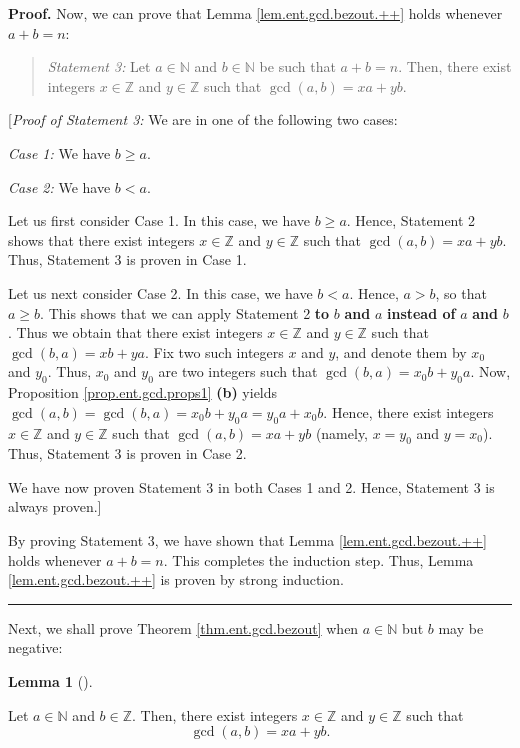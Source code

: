 \documentclass[numbers=enddot,12pt,final,onecolumn,notitlepage]{scrartcl}%
\numberwithin{exer}{subsection}
\theoremstyle{definition}
\newtheorem{lem}[theo]{Lemma}
\newenvironment{lemma}[1][]
{\begin{lem}[#1]\begin{leftbar}}
{\end{leftbar}\end{lem}}
\newenvironment{statement}{\begin{quote}}{\end{quote}}
\newenvironment{proof}[1][Proof]{\noindent\textbf{#1.} }{\ \rule{0.5em}{0.5em}}
\begin{document}
\begin{proof}
Now, we can prove that Lemma \ref{lem.ent.gcd.bezout.++} holds whenever
$a+b=n$:

\begin{statement}
\textit{Statement 3:} Let $a\in\mathbb{N}$ and $b\in\mathbb{N}$ be such that
$a+b=n$. Then, there exist integers $x\in\mathbb{Z}$ and $y\in\mathbb{Z}$ such
that $\gcd\left(  a,b\right)  =xa+yb$.
\end{statement}

[\textit{Proof of Statement 3:} We are in one of the following two cases:

\textit{Case 1:} We have $b\geq a$.

\textit{Case 2:} We have $b<a$.

Let us first consider Case 1. In this case, we have $b\geq a$. Hence,
Statement 2 shows that there exist integers $x\in\mathbb{Z}$ and
$y\in\mathbb{Z}$ such that $\gcd\left(  a,b\right)  =xa+yb$. Thus, Statement 3
is proven in Case 1.

Let us next consider Case 2. In this case, we have $b<a$. Hence, $a>b$, so
that $a\geq b$. This shows that we can apply Statement 2 \textbf{to }%
$b$\textbf{ and }$a$ \textbf{instead of }$a$ \textbf{and }$b$. Thus we obtain
that there exist integers $x\in\mathbb{Z}$ and $y\in\mathbb{Z}$ such that
$\gcd\left(  b,a\right)  =xb+ya$. Fix two such integers $x$ and $y$, and
denote them by $x_{0}$ and $y_{0}$. Thus, $x_{0}$ and $y_{0}$ are two integers
such that $\gcd\left(  b,a\right)  =x_{0}b+y_{0}a$. Now, Proposition
\ref{prop.ent.gcd.props1} \textbf{(b)} yields $\gcd\left(  a,b\right)
=\gcd\left(  b,a\right)  =x_{0}b+y_{0}a=y_{0}a+x_{0}b$. Hence, there exist
integers $x\in\mathbb{Z}$ and $y\in\mathbb{Z}$ such that $\gcd\left(
a,b\right)  =xa+yb$ (namely, $x=y_{0}$ and $y=x_{0}$). Thus, Statement 3 is
proven in Case 2.

We have now proven Statement 3 in both Cases 1 and 2. Hence, Statement 3 is
always proven.]

By proving Statement 3, we have shown that Lemma \ref{lem.ent.gcd.bezout.++}
holds whenever $a+b=n$. This completes the induction step. Thus, Lemma
\ref{lem.ent.gcd.bezout.++} is proven by strong induction.
\end{proof}

Next, we shall prove Theorem \ref{thm.ent.gcd.bezout} when $a\in\mathbb{N}$
but $b$ may be negative:

\begin{lemma}
\label{lem.ent.gcd.bezout.+}Let $a\in\mathbb{N}$ and $b\in\mathbb{Z}$. Then,
there exist integers $x\in\mathbb{Z}$ and $y\in\mathbb{Z}$ such that%
\[
\gcd\left(  a,b\right)  =xa+yb.
\]

\end{lemma}
\end{document}
